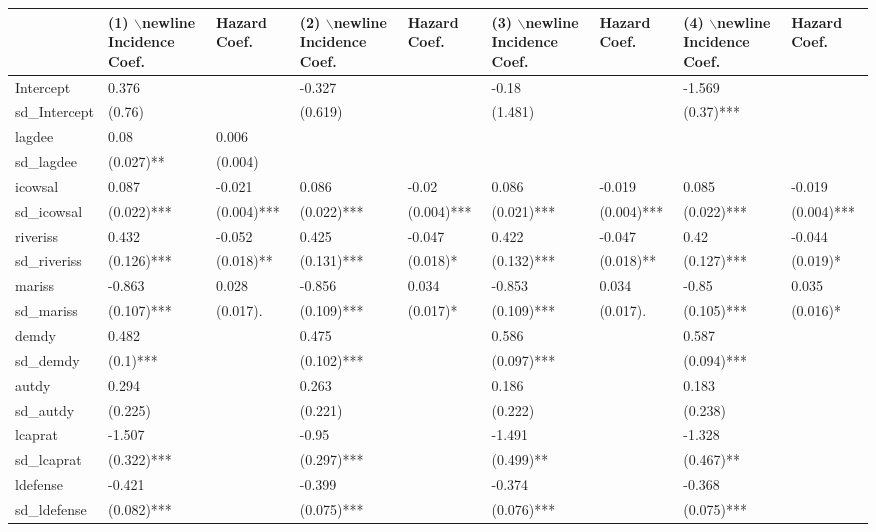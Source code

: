 \begin{table}[ht]
\centering
\begin{tabular}{lllllllll}
  \toprule
  & (1) $\backslash$newline Incidence Coef. &  Hazard Coef. & (2) $\backslash$newline Incidence Coef. &  Hazard Coef. & (3) $\backslash$newline Incidence Coef. &  Hazard Coef. & (4) $\backslash$newline Incidence Coef. &  Hazard Coef. \\ 
  \midrule
Intercept & 0.376 &  & -0.327 &  & -0.18 &  & -1.569 &  \\ 
  sd\_Intercept & (0.76)  &  & (0.619)  &  & (1.481)  &  & (0.37)*** &  \\ 
  lagdee & 0.08 & 0.006 &  &  &  &  &  &  \\ 
  sd\_lagdee & (0.027)** & (0.004)  &  &  &  &  &  &  \\ 
  icowsal & 0.087 & -0.021 & 0.086 & -0.02 & 0.086 & -0.019 & 0.085 & -0.019 \\ 
  sd\_icowsal & (0.022)*** & (0.004)*** & (0.022)*** & (0.004)*** & (0.021)*** & (0.004)*** & (0.022)*** & (0.004)*** \\ 
  riveriss & 0.432 & -0.052 & 0.425 & -0.047 & 0.422 & -0.047 & 0.42 & -0.044 \\ 
  sd\_riveriss & (0.126)*** & (0.018)** & (0.131)*** & (0.018)* & (0.132)*** & (0.018)** & (0.127)*** & (0.019)* \\ 
  mariss & -0.863 & 0.028 & -0.856 & 0.034 & -0.853 & 0.034 & -0.85 & 0.035 \\ 
  sd\_mariss & (0.107)*** & (0.017). & (0.109)*** & (0.017)* & (0.109)*** & (0.017). & (0.105)*** & (0.016)* \\ 
  demdy & 0.482 &  & 0.475 &  & 0.586 &  & 0.587 &  \\ 
  sd\_demdy & (0.1)*** &  & (0.102)*** &  & (0.097)*** &  & (0.094)*** &  \\ 
  autdy & 0.294 &  & 0.263 &  & 0.186 &  & 0.183 &  \\ 
  sd\_autdy & (0.225)  &  & (0.221)  &  & (0.222)  &  & (0.238)  &  \\ 
  lcaprat & -1.507 &  & -0.95 &  & -1.491 &  & -1.328 &  \\ 
  sd\_lcaprat & (0.322)*** &  & (0.297)*** &  & (0.499)** &  & (0.467)** &  \\ 
  ldefense & -0.421 &  & -0.399 &  & -0.374 &  & -0.368 &  \\ 
  sd\_ldefense & (0.082)*** &  & (0.075)*** &  & (0.076)*** &  & (0.075)*** &  \\ 

\end{tabular}
\end{table}
